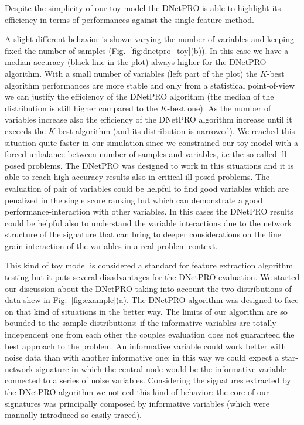 \documentclass{standalone}
\begin{document}
Despite the simplicity of our toy model the DNetPRO is able to highlight its efficiency in terms of performances against the single-feature method.

A slight different behavior is shown varying the number of variables and keeping fixed the number of samples (Fig.~\ref{fig:dnetpro_toy}(b)).
In this case we have a median accuracy (black line in the plot) always higher for the DNetPRO algorithm.
With a small number of variables (left part of the plot) the $K$-best algorithm performances are more stable and only from a statistical point-of-view we can justify the efficiency of the DNetPRO algorithm (the median of the distribution is still higher compared to the $K$-best one).
As the number of variables increase also the efficiency of the DNetPRO algorithm increase until it exceeds the $K$-best algorithm (and its distribution is narrowed).
We reached this situation quite faster in our simulation since we constrained our toy model with a forced unbalance between number of samples and variables, i.e the so-called ill-posed problems.
The DNetPRO was designed to work in this situations and it is able to reach high accuracy results also in critical ill-posed problems.
The evaluation of pair of variables could be helpful to find good variables which are penalized in the single score ranking but which can demonstrate a good performance-interaction with other variables.
In this cases the DNetPRO results could be helpful also to understand the variable interactions due to the network structure of the signature that can bring to deeper considerations on the fine grain interaction of the variables in a real problem context.

This kind of toy model is considered a standard for feature extraction algorithm testing but it puts several disadvantages for the DNetPRO evaluation.
We started our discussion about the DNetPRO taking into account the two distributions of data shew in Fig.~\ref{fig:example}(a).
The DNetPRO algorithm was designed to face on that kind of situations in the better way.
The limits of our algorithm are so bounded to the sample distributions: if the informative variables are totally independent one from each other the couples evaluation does not guaranteed the best approach to the problem.
An informative variable could work better with noise data than with another informative one: in this way we could expect a star-network signature in which the central node would be the informative variable connected to a series of noise variables.
Considering the signatures extracted by the DNetPRO algorithm we noticed this kind of behavior: the core of our signatures was principally composed by informative variables (which were manually introduced so easily traced).
\end{document}

